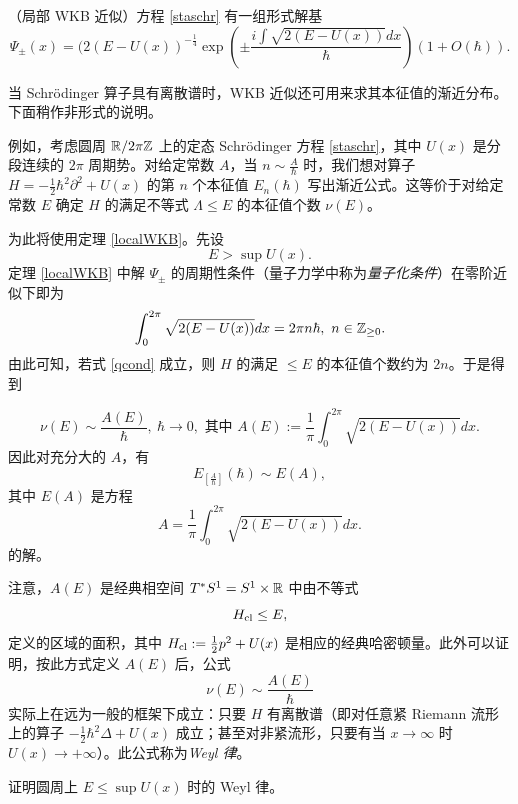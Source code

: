 \begin{theorem}\label{localWKB} （局部 WKB 近似）方程 \eqref{staschr} 有一组形式解基
$$
\Psi_\pm(x)=(2(E-U(x))^{-\frac{1}{4}}\exp\left(\pm \frac{i\int \sqrt{2(E-U(x))}dx}{\hbar}\right)(1+O(\hbar)).
$$
\end{theorem} 

当 Schrödinger 算子具有离散谱时，WKB 近似还可用来求其本征值的渐近分布。下面稍作非形式的说明。

例如，考虑圆周 $\Bbb R/2\pi \Bbb Z$ 上的定态 Schrödinger 方程
\eqref{staschr}，其中 $U(x)$ 是分段连续的 $2\pi$ 周期势。对给定常数 $A$，当 $n\sim \frac{A}{\hbar}$ 时，我们想对算子 $H=-\frac{1}{2}\hbar^2\partial^2+U(x)$ 的第 $n$ 个本征值 $E_n(\hbar)$ 写出渐近公式。这等价于对给定常数 $E$ 确定 $H$ 的满足不等式 $\Lambda\le E$ 的本征值个数 $\nu(E)$。

为此将使用定理 \ref{localWKB}。先设
$$
E>\sup U(x).
$$  
定理 \ref{localWKB} 中解 $\Psi_\pm$ 的周期性条件（量子力学中称为\emph{量子化条件}）在零阶近似下即为
\begin{equation}\label{qcond}
\int_0^{2\pi} \sqrt{2(E-U(x))}dx=2\pi n\hbar,\ n\in \Bbb Z_{\ge 0}.
\end{equation} 
由此可知，若式 \ref{qcond} 成立，则 $H$ 的满足 $\le E$ 的本征值个数约为 $2n$。于是得到

\begin{proposition}\label{weyllaw}
$$
\nu(E)\sim \frac{A(E)}{\hbar},\ \hbar\to 0,\text{ 其中 } A(E):=\frac{1}{\pi}\int_0^{2\pi} \sqrt{2(E-U(x))}dx.
$$
因此对充分大的 $A$，有
$$
E_{[\frac{A}{\hbar}]}(\hbar)\sim E(A),
$$ 
其中
$E(A)$ 是方程
$$
A=\frac{1}{\pi}\int_0^{2\pi}\sqrt{2(E-U(x))}dx.
$$
的解。
\end{proposition}  

注意，$A(E)$ 是经典相空间 $T^*S^1=S^1\times \Bbb R$ 中由不等式
$$
H_{\rm cl}\le E,
$$
定义的区域的面积，其中 $H_{\rm cl}:=\frac{1}{2}p^2+U(x)$ 是相应的经典哈密顿量。此外可以证明，按此方式定义 $A(E)$ 后，公式
$$
\nu(E)\sim \frac{A(E)}{\hbar}
$$
实际上在远为一般的框架下成立：只要 $H$ 有离散谱（即对任意紧 Riemann 流形上的算子 $-\frac{1}{2}\hbar^2\Delta+U(x)$ 成立；甚至对非紧流形，只要有当 $x\to \infty$ 时 $U(x)\to +\infty$）。此公式称为\emph{Weyl 律}。

\begin{exercise} 证明圆周上 $E\le \sup U(x)$ 时的 Weyl 律。
\end{exercise} 


